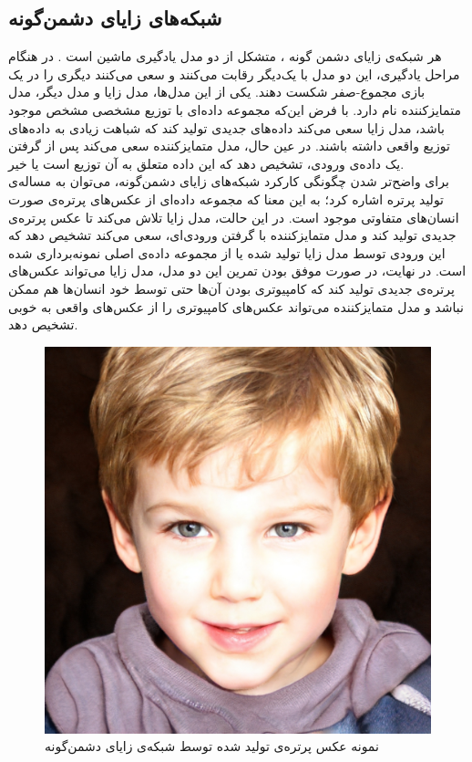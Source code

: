 \subsection{
شبکه‌های زایای دشمن‌گونه
}
هر شبکه‌ی زایای دشمن گونه
، متشکل از دو مدل یادگیری ماشین است
\cite{goodfellow_gan}
.
در هنگام مراحل یادگیری، این دو مدل با یک‌دیگر رقابت می‌کنند و سعی می‌کنند دیگری را در یک بازی مجموع-صفر
شکست دهند. یکی از این مدل‌ها، مدل زایا
و مدل دیگر، مدل متمایزکننده
نام دارد. 
با فرض این‌که مجموعه داده‌ای با توزیع مشخصی
مشخص موجود باشد، مدل زایا سعی می‌کند داده‌های جدیدی تولید کند که شباهت زیادی به داده‌های توزیع واقعی داشته باشند. در عین حال، مدل متمایزکننده سعی می‌کند پس از گرفتن یک داده‌ی ورودی، تشخیص دهد که این داده متعلق به آن توزیع است یا خیر.
\\
برای واضح‌تر شدن چگونگی کارکرد شبکه‌های زایای دشمن‌گونه، می‌توان به مساله‌ی تولید پرتره اشاره کرد؛ به این معنا که مجموعه داده‌ای از عکس‌های پرتره‌ی صورت انسان‌های متفاوتی موجود است. در این حالت، مدل زایا تلاش می‌کند تا عکس پرتره‌ی جدیدی تولید کند و مدل متمایزکننده با گرفتن ورودی‌ای، سعی می‌کند تشخیص دهد که این ورودی توسط مدل زایا تولید شده یا از مجموعه داده‌ی اصلی نمونه‌برداری شده است.
در نهایت، در صورت موفق بودن تمرین این دو مدل، مدل زایا می‌تواند عکس‌های پرتره‌ی جدیدی تولید کند که کامپیوتری بودن آن‌ها حتی توسط خود انسان‌ها هم ممکن نباشد و مدل متمایزکننده می‌تواند عکس‌های کامپیوتری را از عکس‌های واقعی به خوبی تشخیص دهد. 

\begin{figure}
	\centering
	\includegraphics[scale=0.2]{figures/fakeperson.jpg}
	\caption [
	نمونه عکس پرتره‌ی تولید شده توسط شبکه‌ی زایای دشمن‌گونه
	]{
	نمونه عکس پرتره‌ی تولید شده توسط شبکه‌ی زایای دشمن‌گونه
	\cite{thisperson}
	}
	\label{fig:lstmblock}
\end{figure}